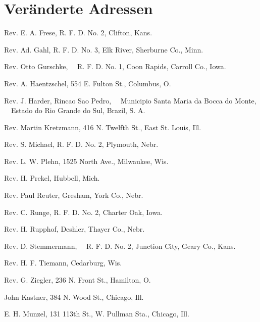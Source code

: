 \chapter{Veränderte Adressen}


Rev. E. A. Frese, R. F. D. No. 2, Clifton, Kans.

Rev. Ad. Gahl, R. F. D. No. 3, Elk River, Sherburne Co., Minn.

Rev. Otto Gurschke,
 R. F. D. No. 1, Coon Rapids, Carroll Co., Iowa.

Rev. A. Haentzschel, 554 E. Fulton St., Columbus, O.

Rev. J. Harder, Rincao Sao Pedro,
 Municipio Santa Maria da Bocca do Monte,
 Estado do Rio Grande do Sul, Brazil, S. A.

Rev. Martin Kretzmann, 416 N. Twelfth St., East St. Louis, Ill.

Rev. S. Michael, R. F. D. No. 2, Plymouth, Nebr.

Rev. L. W. Plehn, 1525 North Ave., Milwaukee, Wis.

Rev. H. Prekel, Hubbell, Mich.

Rev. Paul Reuter, Gresham, York Co., Nebr.

Rev. C. Runge, R. F. D. No. 2, Charter Oak, Iowa.

Rev. H. Rupphof, Deshler, Thayer Co., Nebr.

Rev. D. Stemmermann,
 R. F. D. No. 2, Junction City, Geary Co., Kans.

Rev. H. F. Tiemann, Cedarburg, Wis.

Rev. G. Ziegler, 236 N. Front St., Hamilton, O.

John Kastner, 384 N. Wood St., Chicago, Ill.

E. H. Munzel, 131 113th St., W. Pullman Sta., Chicago, Ill.
